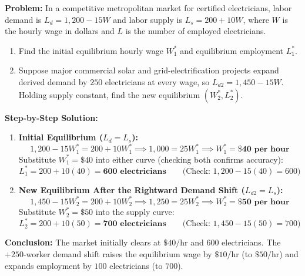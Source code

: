 \documentclass[11pt,letterpaper]{article}
\begin{document}
\begin{tcolorbox}[colback=CourseBlue!5!white,colframe=CourseBlue!80!black,title=\textbf{Work It Out: Competitive Equilibrium and Demand Shifts for Electricians}]
\textbf{Problem:} In a competitive metropolitan market for certified electricians, labor demand is $L_d = 1{,}200 - 15W$ and labor supply is $L_s = 200 + 10W$, where $W$ is the hourly wage in dollars and $L$ is the number of employed electricians.
\begin{enumerate}
    \item Find the initial equilibrium hourly wage $W_1^*$ and equilibrium employment $L_1^*$.
    \item Suppose major commercial solar and grid-electrification projects expand derived demand by $250$ electricians at every wage, so $L_{d2} = 1{,}450 - 15W$. Holding supply constant, find the new equilibrium $(W_2^*, L_2^*)$.
\end{enumerate}

\medskip
\noindent\textbf{Step-by-Step Solution:}
\begin{enumerate}
    \item \textbf{Initial Equilibrium ($L_d = L_s$):}
    \[
    1{,}200 - 15W_1^* = 200 + 10W_1^* \implies 1{,}000 = 25W_1^* \implies W_1^* = \mathbf{\$40\text{ per hour}}
    \]
    Substitute $W_1^* = \$40$ into either curve (checking both confirms accuracy):
    \[
    L_1^* = 200 + 10(40) = \mathbf{600\text{ electricians}} \qquad \bigl(\text{Check: } 1{,}200 - 15(40) = 600\bigr)
    \]

    \item \textbf{New Equilibrium After the Rightward Demand Shift ($L_{d2} = L_s$):}
    \[
    1{,}450 - 15W_2^* = 200 + 10W_2^* \implies 1{,}250 = 25W_2^* \implies W_2^* = \mathbf{\$50\text{ per hour}}
    \]
    Substitute $W_2^* = \$50$ into the supply curve:
    \[
    L_2^* = 200 + 10(50) = \mathbf{700\text{ electricians}} \qquad \bigl(\text{Check: } 1{,}450 - 15(50) = 700\bigr)
    \]
\end{enumerate}
\textbf{Conclusion:} The market initially clears at $\$40/\text{hr}$ and $600$ electricians. The $+250$-worker demand shift raises the equilibrium wage by $\$10/\text{hr}$ (to $\$50/\text{hr}$) and expands employment by $100$ electricians (to $700$).
\end{tcolorbox}
\end{document}

